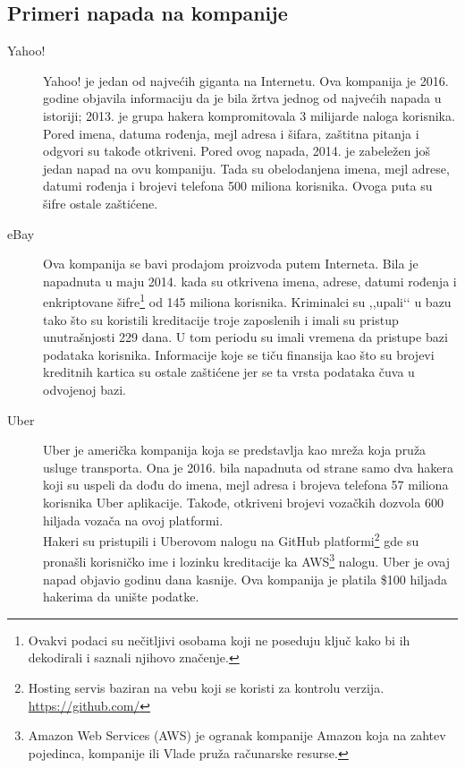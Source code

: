 \documentclass[a4paper]{article}
\theoremstyle{break}
\begin{document}
{\begin{description}
\end{description}


\subsection{Primeri napada na kompanije}
\label{subsec:primeri_napada_kompanije}


\begin{description}
\item [Yahoo!] Yahoo! je jedan od najvećih giganta na Internetu. Ova kompanija je 2016. godine objavila informaciju da je bila žrtva jednog od najvećih napada u istoriji; 2013. je grupa hakera kompromitovala 3 milijarde naloga korisnika. Pored imena, datuma rođenja, mejl adresa i šifara, zaštitna pitanja i odgvori su takođe otkriveni. 
Pored ovog napada, 2014. je zabeležen još jedan napad na ovu kompaniju. Tada su obelodanjena imena, mejl adrese, datumi rođenja i brojevi telefona 500 miliona korisnika. Ovoga puta su šifre ostale zaštićene. 
\item [eBay] Ova kompanija se bavi prodajom proizvoda putem Interneta. Bila je napadnuta u maju 2014. kada su otkrivena imena, adrese, datumi rođenja i enkriptovane šifre\footnote{Ovakvi podaci su nečitljivi osobama koji ne poseduju ključ kako bi ih dekodirali i saznali njihovo značenje.} od 145 miliona korisnika. Kriminalci su ,,upali‘‘ u bazu tako što su koristili kreditacije troje zaposlenih i imali su pristup unutrašnjosti 229 dana. U tom periodu su imali vremena da pristupe bazi podataka korisnika. Informacije koje se tiču finansija kao što su brojevi kreditnih kartica su ostale zaštićene jer se ta vrsta podataka čuva u odvojenoj bazi.
\item [Uber] Uber je američka kompanija koja se predstavlja kao mreža koja pruža usluge transporta. Ona je 2016. bila napadnuta od strane samo dva hakera koji su uspeli da dođu do imena, mejl adresa i brojeva telefona 57 miliona korisnika Uber aplikacije. Takođe, otkriveni brojevi vozačkih dozvola 600 hiljada vozača na ovoj platformi.\\Hakeri su pristupili i Uberovom nalogu na GitHub platformi\footnote{Hosting servis baziran na vebu koji se koristi za kontrolu verzija. \url{https://github.com/}} gde su pronašli korisničko ime i lozinku kreditacije ka AWS\footnote{Amazon Web Services (AWS) je ogranak kompanije Amazon koja na zahtev pojedinca, kompanije ili Vlade pruža računarske resurse.} nalogu. 
Uber je ovaj napad objavio godinu dana kasnije. Ova kompanija je platila \$100 hiljada hakerima da unište podatke.  
\end{description}
 
}
\end{document}
